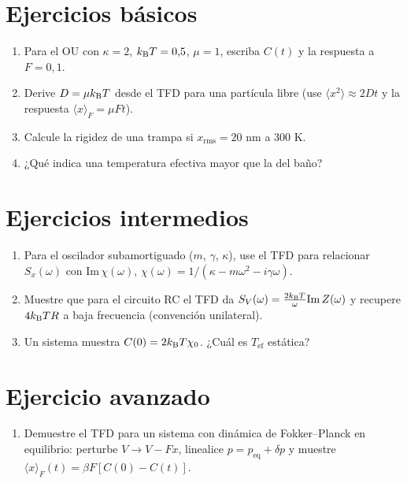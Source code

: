 \documentclass[11pt,a4paper]{article}
\begin{document}

\section{Ejercicios básicos}
\begin{enumerate}[label=\textbf{B\arabic*.}]
\item Para el OU con $\kappa=2$, $k_{\mathrm B} T=0{,}5$, $\mu=1$, escriba $C(t)$ y la respuesta a $F=0{,}1$.
\item Derive $D=\mu k_{\mathrm B} T$ desde el TFD para una partícula libre (use $\langle x^2\rangle\approx2Dt$ y la respuesta $\langle x\rangle_F=\mu Ft$).
\item Calcule la rigidez de una trampa si $x_{\text{rms}}=20$ nm a 300 K.
\item ¿Qué indica una temperatura efectiva mayor que la del baño?
\end{enumerate}

\section{Ejercicios intermedios}
\begin{enumerate}[label=\textbf{I\arabic*.}]
\item Para el oscilador subamortiguado ($m$, $\gamma$, $\kappa$), use el TFD para relacionar $S_x(\omega)$ con $\mathrm{Im}\,\chi(\omega)$, $\chi(\omega)=1/(\kappa-m\omega^2-i\gamma\omega)$.
\item Muestre que para el circuito RC el TFD da $S_V(\omega)=\frac{2k_{\mathrm B} T}{\omega}\mathrm{Im}\,Z(\omega)$ y recupere $4k_{\mathrm B} TR$ a baja frecuencia (convención unilateral).
\item Un sistema muestra $C(0)=2k_{\mathrm B} T\chi_0$. ¿Cuál es $T_{\text{ef}}$ estática?
\end{enumerate}

\section{Ejercicio avanzado}
\begin{enumerate}[label=\textbf{A\arabic*.}]
\item Demuestre el TFD para un sistema con dinámica de Fokker--Planck en equilibrio: perturbe $V\to V-Fx$, linealice $p=p_{\text{eq}}+\delta p$ y muestre $\langle x\rangle_F(t)=\beta F[C(0)-C(t)]$.
\end{enumerate}
\end{document}
